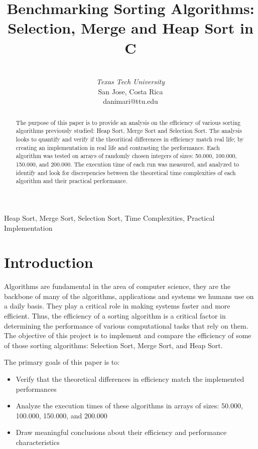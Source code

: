 \documentclass[conference]{IEEEtran}
\title{Benchmarking Sorting Algorithms: Selection, Merge and Heap Sort in C}
\author{\IEEEauthorblockN{Daniel Marin} \IEEEauthorblockA{\textit{Department of Computer Science}} \\ \textit{Texas Tech University} \\ San Jose, Costa Rica \\ danimari@ttu.edu}
\begin{document}
\maketitle
\begin{abstract}
The purpose of this paper is to provide an analysis on the efficiency of various sorting algorithms previously studied: Heap Sort, Merge Sort and Selection Sort. The analysis looks to quantify and verify if the theoritical differences in efficiency match real life; by creating an implementation in real life and contrasting the performance. Each algorithm was tested on arrays of randomly chosen integers of sizes: 50.000, 100.000, 150.000, and 200.000. The execution time of each run was measured, and analyzed to identify and look for discrepencies between the theoretical time complexities of each algorithm and their practical performance. 
\end{abstract}

\begin{IEEEkeywords}
Heap Sort, Merge Sort, Selection Sort, Time Complexities, Practical Implementation
\end{IEEEkeywords}

\section{Introduction}
 Algorithms are fundamental in the area of computer science, they are the backbone of many of the algorithms, applications and systems we humans use on a daily basis. They play a critical role in making systems faster and more efficient. Thus, the efficiency of a sorting algorithm is a critical factor in determining the performance of various computational tasks that rely on them. The objective of this project is to implement and compare the efficiency of some of those sorting algorithms: Selection Sort, Merge Sort, and Heap Sort.

The primary goals of this paper is to:
\begin{itemize}
    \item Verify that the theoretical differences in efficiency match the implemented performances
    \item Analyze the execution times of these algorithms in arrays of sizes: 50.000, 100.000, 150.000, and 200.000
    \item Draw meaningful conclusions about their efficiency and performance characteristics
\end{itemize}
\end{document}
